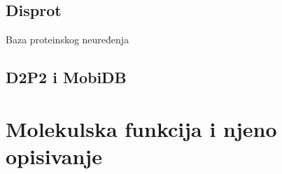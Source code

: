 \subsection{Disprot}

Baza proteinskog neuređenja 

\subsection{D2P2 i MobiDB}

\section{Molekulska funkcija i njeno opisivanje}

